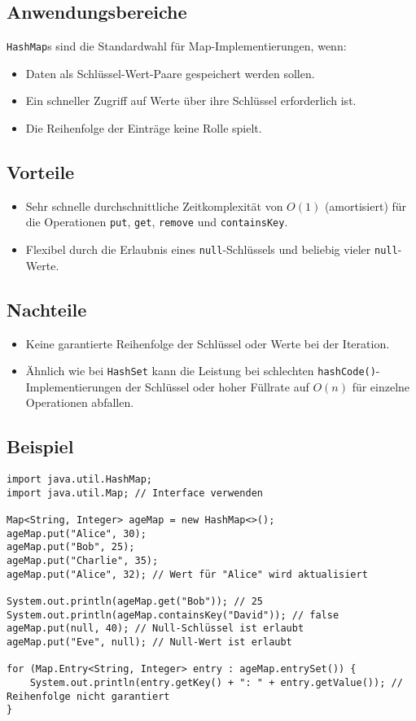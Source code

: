 \subsection{Anwendungsbereiche}
\texttt{HashMap}s sind die Standardwahl für Map-Implementierungen, wenn:
\begin{itemize}
    \item Daten als Schlüssel-Wert-Paare gespeichert werden sollen.
    \item Ein schneller Zugriff auf Werte über ihre Schlüssel erforderlich ist.
    \item Die Reihenfolge der Einträge keine Rolle spielt.
\end{itemize}

\subsection{Vorteile}
\begin{itemize}
    \item Sehr schnelle durchschnittliche Zeitkomplexität von $O(1)$ (amortisiert) für die Operationen \texttt{put}, \texttt{get}, \texttt{remove} und \texttt{containsKey}.
    \item Flexibel durch die Erlaubnis eines \texttt{null}-Schlüssels und beliebig vieler \texttt{null}-Werte.
\end{itemize}

\subsection{Nachteile}
\begin{itemize}
    \item Keine garantierte Reihenfolge der Schlüssel oder Werte bei der Iteration.
    \item Ähnlich wie bei \texttt{HashSet} kann die Leistung bei schlechten \texttt{hashCode()}-Implementierungen der Schlüssel oder hoher Füllrate auf $O(n)$ für einzelne Operationen abfallen.
\end{itemize}

\subsection{Beispiel}
\begin{lstlisting}[caption={Beispiel für die Verwendung einer HashMap in Java}, label=lst:hashMapExample]
import java.util.HashMap;
import java.util.Map; // Interface verwenden

Map<String, Integer> ageMap = new HashMap<>();
ageMap.put("Alice", 30);
ageMap.put("Bob", 25);
ageMap.put("Charlie", 35);
ageMap.put("Alice", 32); // Wert für "Alice" wird aktualisiert

System.out.println(ageMap.get("Bob")); // 25
System.out.println(ageMap.containsKey("David")); // false
ageMap.put(null, 40); // Null-Schlüssel ist erlaubt
ageMap.put("Eve", null); // Null-Wert ist erlaubt

for (Map.Entry<String, Integer> entry : ageMap.entrySet()) {
    System.out.println(entry.getKey() + ": " + entry.getValue()); // Reihenfolge nicht garantiert
}
\end{lstlisting}

